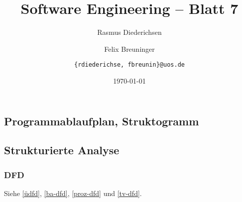 \documentclass{scrartcl}
\title{\rmfamily Software Engineering -- Blatt 7}
\author{Rasmus Diederichsen \and Felix Breuninger\and 
   \texttt{\{rdiederichse, fbreunin\}@uos.de}
}
\date{\today}
\begin{document}
\selectfont
\maketitle

\setcounter{section}{7}
\setcounter{subsection}{0}

\subsection{Programmablaufplan, Struktogramm}
\subsection{Strukturierte Analyse}

\subsubsection{DFD}

Siehe \autoref{üdfd}, \autoref{ba-dfd}, \autoref{proz-dfd} und \autoref{tv-dfd}.
\end{document}
